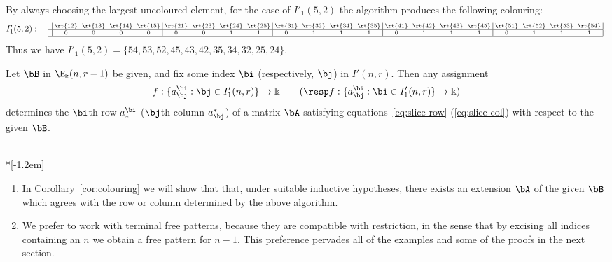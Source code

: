 \begin{exam}
By always choosing the largest uncoloured element, for the case of
$I'_1(5,2)$ the algorithm produces the following colouring:
\[
 I'_1(5,2): \quad
\text{\setlength{\arraycolsep}{2.7pt}\scriptsize
$\displaystyle \begin{array}{c|cccc|cccc|cccc|cccc|cccc|}
 &\rt{12}&\rt{13}&\rt{14}&\rt{15}&\rt{21} &\rt{23}&\rt{24}&\rt{25}
 &\rt{31}&\rt{32} &\rt{34}&\rt{35}&\rt{41}&\rt{42}&\rt{43} &\rt{45} 
 &\rt{51}&\rt{52}&\rt{53} &\rt{54} \\ \hline
 &0&0&0&0	&0&0&1&1	 &0&1&1&1	&0&1&1&1 &0&1&1&1
 \\ 
 \hline
\end{array}\; .$}
\]
Thus we have $I'_1(5,2) = \{54, 53, 52, 45, 43, 42, 35, 34, 32, 25, 24\}$.
\end{exam}

Let $\bB$ in $\E_\Bbbk(n,r-1)$ be given, and fix some index $\bi$
(respectively, $\bj$) in $I'(n,r)$. Then any assignment
 \[
 f: \{ a^\bi_\bj : \bj \in I'_1(n,r)\} \to \Bbbk \qquad (\resp f: \{
 a^\bi_\bj : \bi \in I'_1(n,r)\} \to \Bbbk )
 \]
determines the $\bi$th row $a^\bi_*$ (\resp $\bj$th column $a^*_\bj$)
of a matrix $\bA$ satisfying equations~\eqref{eq:slice-row} (\resp \eqref{eq:slice-col}) with respect to the given $\bB$.


\goodbreak
\begin{rema}\label{rmk:promise}\ \\*[-1.2em]
\begin{enumerate}[label=(\roman*)]
\item\label{rema5.6_i} In Corollary~\ref{cor:colouring} we will show that that, under
suitable inductive hypotheses, there exists an extension $\bA$ of the
given $\bB$ which agrees with the row or column determined by the
above algorithm.

\item\label{rema5.6_ii} We prefer to work with terminal free patterns, because they are
compatible with restriction, in the sense that by excising all indices
containing an $n$ we obtain a free pattern for $n-1$. This preference
pervades all of the examples and some of the proofs in the next
section.
\end{enumerate}
\end{rema}



